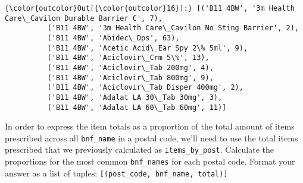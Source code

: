 \documentclass[11pt]{article}
\begin{document}
\begin{Verbatim}[commandchars=\\\{\}]
{\color{outcolor}Out[{\color{outcolor}16}]:} [('B11 4BW', '3m Health Care\_Cavilon Durable Barrier C', 7),
          ('B11 4BW', '3m Health Care\_Cavilon No Sting Barrier', 2),
          ('B11 4BW', 'Abidec\_Dps', 63),
          ('B11 4BW', 'Acetic Acid\_Ear Spy 2\% 5ml', 9),
          ('B11 4BW', 'Aciclovir\_Crm 5\%', 13),
          ('B11 4BW', 'Aciclovir\_Tab 200mg', 4),
          ('B11 4BW', 'Aciclovir\_Tab 800mg', 9),
          ('B11 4BW', 'Aciclovir\_Tab Disper 400mg', 2),
          ('B11 4BW', 'Adalat LA 30\_Tab 30mg', 3),
          ('B11 4BW', 'Adalat LA 60\_Tab 60mg', 11)]
\end{Verbatim}
            
    In order to express the item totals as a proportion of the total amount
of items prescribed across all
\texttt{\textquotesingle{}bnf\_name\textquotesingle{}} in a postal code,
we'll need to use the total items prescribed that we previously
calculated as \texttt{items\_by\_post}. Calculate the proportions for
the most common \texttt{\textquotesingle{}bnf\_names\textquotesingle{}}
for each postal code. Format your answer as a list of tuples:
\texttt{{[}(post\_code,\ bnf\_name,\ total){]}}
\end{document}
